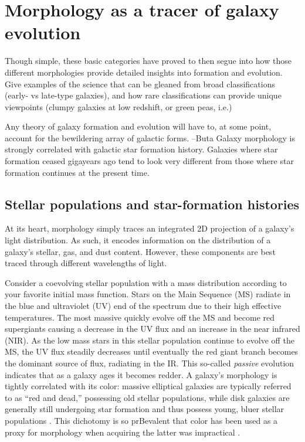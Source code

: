 \section{Morphology as a tracer of galaxy evolution}
Though simple, these basic categories have proved to then segue into how those different morphologies provide detailed insights into formation and evolution. Give examples of the science that can be gleaned from broad classifications (early- vs late-type galaxies), and how rare classifications can provide unique viewpoints (clumpy galaxies at low redshift, or green peas, i.e.)

Any theory of galaxy formation and evolution will
have to, at some point, account for the bewildering array of galactic forms. --Buta
 Galaxy morphology is strongly correlated with galactic star formation history. Galaxies
where star formation ceased gigayears ago tend to look very different from those where star
formation continues at the present time. 


\subsection{Stellar populations and star-formation histories}
At its heart, morphology simply traces an integrated 2D projection of a galaxy's light distribution. As such, it encodes information on the distribution of a galaxy's stellar, gas, and dust content. However, these components are best traced through different wavelengths of light. 

Consider a coevolving stellar population with a mass distribution according to your favorite initial mass function. Stars on the Main Sequence (MS) radiate in the blue and ultraviolet (UV) end of the spectrum due to their high effective temperatures. The most massive quickly evolve off the MS and become red supergiants causing a decrease in the UV flux and an increase in the near infrared (NIR). As the low mass stars in this stellar population continue to evolve off the MS, the UV flux steadily decreases until eventually the red giant branch becomes the dominant source of flux, radiating in the IR. This so-called \textit{passive} evolution indicates that as a galaxy ages it becomes redder. A galaxy's morphology is tightly correlated with its color: massive elliptical galaxies are typically referred to as ``red and dead,'' possessing old stellar populations, while disk galaxies are generally still undergoing star formation and thus possess young, bluer stellar populations \citep[e.g.,][]{Strateva2001,Baldry2004b, Cirasuolo2007, Lee2013, Taylor2015}. This dichotomy is so prBevalent that color has been used as a proxy for morphology when acquiring the latter was impractical \citep[e.g.,][]{Shen2003, Blanton2003c}. 

